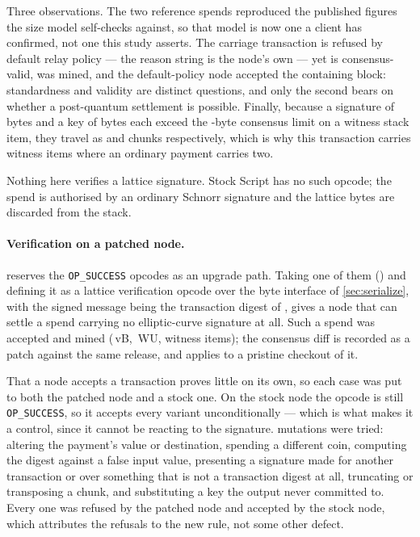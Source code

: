 Three observations. The two reference spends reproduced the published figures the size
model self-checks against, so that model is now one a client has confirmed, not one this study asserts. The carriage transaction is refused by default relay policy --- the
reason string is the node's own --- yet is consensus-valid, was mined, and the
default-policy node accepted the containing block: standardness and validity are distinct
questions, and only the second bears on whether a post-quantum settlement is possible.
Finally, because a signature of \btcTwoSig{} bytes and a key of \btcTwoPk{} bytes each
exceed the \btcChunkWidth-byte consensus limit on a witness stack item, they travel as
\btcSigChunks{} and \btcPkChunks{} chunks respectively, which is why this transaction
carries \btcCarriageItems{} witness items where an ordinary payment carries two.

Nothing here verifies a lattice signature. Stock Script has no such opcode; the spend is
authorised by an ordinary Schnorr signature and the lattice bytes are discarded from the
stack.

\paragraph{Verification on a patched node.}
\cite{bip342} reserves the \texttt{OP\_SUCCESS} opcodes as an upgrade path. Taking one of
them (\btcLasOpcode) and defining it as a lattice verification opcode over the byte
interface of \cref{sec:serialize}, with the signed message being the transaction
digest of \cite{bip341}, gives a node that can settle a spend carrying no elliptic-curve
signature at all. Such a spend was accepted and mined
(\btcLasVsize\,vB, \btcLasWeight\,WU, \btcLasItems{} witness items); the consensus diff is
recorded as a patch against the same release, and applies to a pristine checkout of it.

That a node accepts a transaction proves little on its own, so each case was put to both the
patched node and a stock one. On the stock node the opcode is still \texttt{OP\_SUCCESS},
so it accepts every variant unconditionally --- which is what makes it a control, since it
cannot be reacting to the signature. \btcLasControls{} mutations were tried: altering the
payment's value or destination, spending a different coin, computing the digest against a
false input value, presenting a signature made for another transaction or over something
that is not a transaction digest at all, truncating or transposing a chunk, and substituting
a key the output never committed to. Every one was refused by the patched node and accepted
by the stock node, which attributes the refusals to the new rule, not some other defect.

